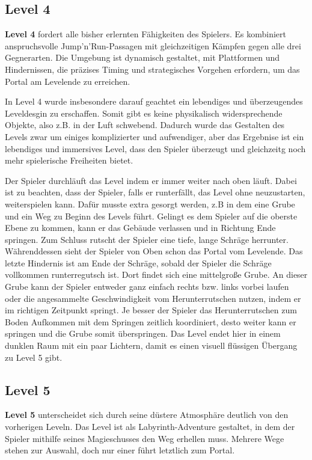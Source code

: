 \documentclass[oneside]{ausarbeitung}
\begin{document}
\subsection{Level 4}
\label{sub:level4}

\textbf{Level 4} fordert alle bisher erlernten Fähigkeiten des Spielers. Es kombiniert anspruchsvolle Jump’n’Run-Passagen mit gleichzeitigen Kämpfen gegen alle drei Gegnerarten. Die Umgebung ist dynamisch gestaltet, mit Plattformen und Hindernissen, die präzises Timing und strategisches Vorgehen erfordern, um das Portal am Levelende zu erreichen.

In Level 4 wurde insbesondere darauf geachtet ein lebendiges und überzeugendes Leveldesgin zu erschaffen. Somit gibt es keine physikalisch widersprechende Objekte, also z.B. in der Luft schwebend. Dadurch wurde das Gestalten des Levels zwar um einiges komplizierter und aufwendiger, aber das Ergebnise ist ein lebendiges und immersives Level, dass den Spieler überzeugt und gleichzeitg noch mehr spielerische Freiheiten bietet.

Der Spieler durchläuft das Level indem er immer weiter nach oben läuft. Dabei ist zu beachten, dass der Spieler, falls er runterfällt, das Level ohne neuzustarten, weiterspielen kann. Dafür musste extra gesorgt werden, z.B in dem eine Grube und ein Weg zu Beginn des Levels führt. Gelingt es dem Spieler auf die oberste Ebene zu kommen, kann er das Gebäude verlassen und in Richtung Ende springen. Zum Schluss rutscht der Spieler eine tiefe, lange Schräge herrunter. Währenddessen sieht der Spieler von Oben schon das Portal vom Levelende. Das letzte Hindernis ist am Ende der Schräge, sobald der Spieler die Schräge vollkommen runterregutsch ist. Dort findet sich eine mittelgroße Grube. An dieser Grube kann der Spieler entweder ganz einfach rechts bzw. links vorbei laufen oder die angesammelte Geschwindigkeit vom Herunterrutschen nutzen, indem er im richtigen Zeitpunkt springt. Je besser der Spieler das Herunterrutschen zum Boden Aufkommen mit dem Springen zeitlich koordiniert, desto weiter kann er springen und die Grube somit überspringen.
Das Level endet hier in einem dunklen Raum mit ein paar Lichtern, damit es einen visuell flüssigen Übergang zu Level 5 gibt.


\subsection{Level 5}
\label{sub:level5}


\textbf{Level 5} unterscheidet sich durch seine düstere Atmosphäre deutlich von den vorherigen Leveln. Das Level ist als Labyrinth-Adventure gestaltet, in dem der Spieler mithilfe seines Magieschusses den Weg erhellen muss. Mehrere Wege stehen zur Auswahl, doch nur einer führt letztlich zum Portal.
\end{document}
